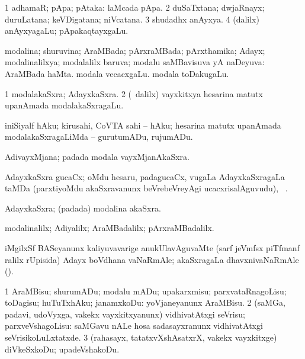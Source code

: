 \bentry
{}
\gl{\nA}
\bmng
\bnum
\num{1} adhamaR; pApa; pAtaka:  laMcada pApa. 
\num{2} duSaTxtana; dwjaRnayx; duruLatana; keVDigatana; niVcatana. 
\num{3} shudadhx anAyxya. 
\num{4} (\bava dalilx) anAyxyagaLu; pApakaqtayxgaLu. 
\enum
\emng
\eentry

\bentry
{}
\gl{\gu}
\bmng
modalina; shuruvina; AraMBada; pArxraMBada; pArxthamika; Adayx; modalinalilxya; modalalilx baruva; modalu saMBavisuva yA naDeyuva:  AraMBada haMta.  modala vecacxgaLu.  modala toDakugaLu. 
\emng
\eentry

\bentry
{}
\gl{\nA}
\bmng
\bnum
\num{1} modalakaSxra; AdayxkaSxra. 
\num{2} (\kanmu\ \bava dalilx) vayxkitxya hesarina matutx upanAmada modalakaSxragaLu. 
\enum
\emng
\eentry

\bentry
{}
\gl{\sakirx}
\bmng
 iniSiyalf hAku; kirusahi, CoVTA sahi -- hAku; hesarina matutx upanAmada modalakaSxragaLiMda -- gurutumADu, rujumADu. 
\emng
\eentry

\bentry
{}
\gl{\nA}
\bmng
AdivayxMjana; padada modala vayxMjanAkaSxra. 
\emng
\eentry

\bentry
{}
\gl{\nA}
\bmng
AdayxkaSxra gucaCx; oMdu hesaru, padagucaCx, \mo vugaLa AdayxkaSxragaLa taMDa (parxtiyoMdu akaSxravanunx beVrebeVreyAgi ucacxrisalAguvudu), \udA\ . 
\emng
\eentry

\bentry
{}
\gl{\nA}
\bmng
AdayxkaSxra; (padada) modalina akaSxra. 
\emng
\eentry

\bentry
{}
\gl{\kirxvi}
\bmng
modalinalilx; Adiyalilx; AraMBadalilx; pArxraMBadalilx. 
\emng
\eentry

\bentry
{}
\gl{\nA}
\bmng
iMgilxSf BASeyanunx kaliyuvavarige anukUlavAguvaMte (sarf jeVmfsx piTfmanf  ralilx rUpisida) Adayx boVdhana vaNaRmAle;  akaSxragaLa dhavxnivaNaRmAle (). 
\emng
\eentry

\bentry
{}
\gl{\sakirx}
\bmng
\bnum
\num{1} AraMBisu; shurumADu; modalu mADu; upakarxmisu; parxvataRnagoLisu; toDagisu; huTuTxhAku; janamxkoDu:  yoVjaneyanunx AraMBisu. 
\num{2} (saMGa, padavi, udoVyxga, \mo vakekx vayxkitxyanunx) vidhivatAtxgi seVrisu; parxveVshagoLisu:  saMGavu nALe hosa sadasayxranunx vidhivatAtxgi seVrisikoLuLxtatxde. 
\num{3} (rahasayx, tatatxvXshAsatxrX, \mo vakekx vayxkitxge) diVkeSxkoDu; upadeVshakoDu. 
\enum
\emng
\eentry

